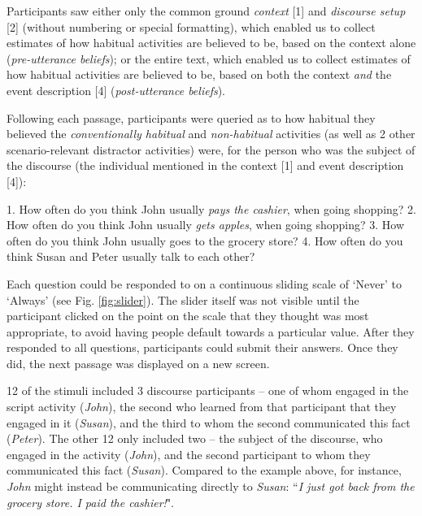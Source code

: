 \documentclass{sp}\usepackage[]{graphicx}\usepackage[]{color}
\begin{document}
Participants saw either only the common ground \textit{context} [1] and \textit{discourse setup} [2] (without numbering or special formatting), which enabled us to collect estimates of how habitual activities are believed to be, based on the context alone (\textit{pre-utterance beliefs}); or the entire text, which enabled us to collect estimates of how habitual activities are believed to be, based on both the context \textit{and} the event description [4] (\textit{post-utterance beliefs}). 

Following each passage, participants were queried as to how habitual they believed the \textit{conventionally habitual} and \textit{non-habitual} activities (as well as 2 other scenario-relevant distractor activities) were, for the person who was the subject of the discourse (the individual mentioned in the context [1] and event description [4]):

1. How often do you think John usually \textit{pays the cashier}, when going shopping?
2. How often do you think John usually \textit{gets apples}, when going shopping?
3. How often do you think John usually goes to the grocery store?
4. How often do you think Susan and Peter usually talk to each other?

Each question could be responded to on a continuous sliding scale of `Never' to `Always' (see Fig. \ref{fig:slider}). The slider itself was not visible until the participant clicked on the point on the scale that they thought was most appropriate, to avoid having people default towards a particular value. After they responded to all questions, participants could submit their answers. Once they did, the next passage was displayed on a new screen. 

12 of the stimuli included 3 discourse participants -- one of whom engaged in the script activity (\textit{John}), the second who learned from that participant that they engaged in it (\textit{Susan}), and the third to whom the second communicated this fact (\textit{Peter}). The other 12 only included two -- the subject of the discourse, who engaged in the activity (\textit{John}), and the second participant to whom they communicated this fact (\textit{Susan}). Compared to the example above, for instance, \textit{John} might instead be communicating directly to \textit{Susan}: ``\textit{I just got back from the grocery store. I paid the cashier!}". 
\end{document}
